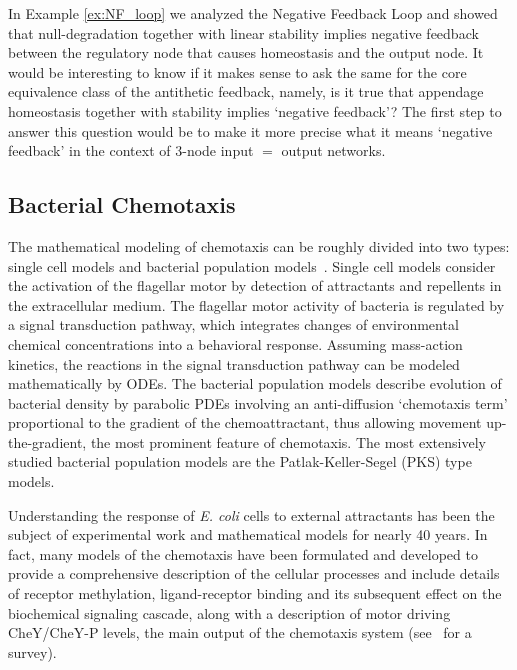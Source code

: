 \documentclass[a4paper,fleqn]{cas-dc}
\begin{document}
In Example \ref{ex:NF_loop} we analyzed the Negative Feedback Loop and showed that null-degradation together with linear stability implies negative feedback between the regulatory node that causes homeostasis and the output node.
It would be interesting to know if it makes sense to ask the same for the core equivalence class of the antithetic feedback, namely, is it true that appendage homeostasis together with stability implies `negative feedback'?
The first step to answer this question would be to make it more precise what it means `negative feedback' in the context of $3$-node input $=$ output networks.

\subsection{Bacterial Chemotaxis}
\label{SS:BAC_CHEMO}

The mathematical modeling of chemotaxis can be roughly divided into two types: single cell models and bacterial population models~\cite{tindall2008a,tindall2008b}. 
Single cell models consider the activation of the flagellar motor by detection of attractants and repellents in the extracellular medium. 
The flagellar motor activity of bacteria is regulated by a signal transduction pathway, which integrates changes of environmental chemical concentrations into a behavioral response. 
Assuming mass-action kinetics, the reactions in the signal transduction pathway can be modeled mathematically by ODEs. 
The bacterial population models describe evolution of bacterial density by parabolic PDEs involving an anti-diffusion `chemotaxis term' proportional to the gradient of the chemoattractant, thus allowing movement up-the-gradient, the most prominent feature of chemotaxis. 
The most extensively studied bacterial population models are the Patlak-Keller-Segel (PKS) type models.

Understanding the response of \textit{E. coli} cells to external attractants has been the subject of experimental work and mathematical models for nearly 40 years. 
In fact, many models of the chemotaxis have been formulated and developed to provide a comprehensive description of the cellular processes and include details of receptor methylation, ligand-receptor binding and its subsequent effect on the biochemical signaling cascade, along with a description of motor driving CheY/CheY-P levels, the main output of the chemotaxis system  (see~\cite{tindall2008a} for a survey).
\end{document}
